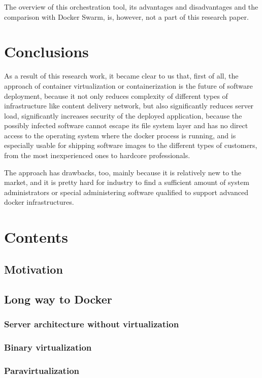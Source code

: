 The overview of this orchestration tool, its advantages and disadvantages
and the comparison with Docker Swarm, is, however, not a part of
this research paper.

\section{Conclusions}

As a result of this research work, it became clear to us that, first of all,
the approach of container virtualization or containerization
is the future of software deployment, because it not only reduces complexity of
different types of infrastructure like content delivery network,
but also significantly reduces server load, significantly
increases security of the deployed application,
because the possibly infected software cannot
escape its file system layer and has no direct access
to the operating system where the docker process is running, and is
especially usable for shipping software
images to the different types of customers,
from the most inexperienced ones to hardcore professionals.

The approach has drawbacks, too, mainly
because it is relatively new to the market,
and it is pretty hard for industry to find
a sufficient amount of system administrators or special
administering software qualified to support advanced docker infrastructures.

\appendix
\section{Contents}
\subsection{Motivation}
\subsection{Long way to Docker}
\subsubsection{Server architecture without virtualization}
\subsubsection{Binary virtualization}
\subsubsection{Paravirtualization}
